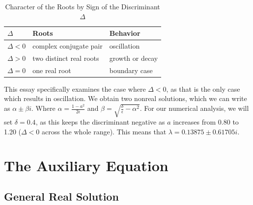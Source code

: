     \begin{table}[H]
        \centering
        \begin{tabular}{lll}
            \toprule
            \textbf{$\Delta$} & \textbf{Roots} & \textbf{Behavior} \\
            \midrule
            $\Delta<0$ & complex conjugate pair  & oscillation \\
            $\Delta>0$ & two distinct real roots & growth or decay \\
            $\Delta=0$ & one real root           & boundary case \\
            \bottomrule
        \end{tabular}
        \caption{Character of the Roots by Sign of the Discriminant $\Delta$}
        \label{tab:discriminant}
    \end{table}

    This essay specifically examines the case where $\Delta<0$, as that is the only case which results in oscillation. We obtain two nonreal solutions, which we can write as $\alpha\pm\beta i$. Where $\alpha=\frac{1-a^2}{2\epsilon}$ and $\beta=\sqrt{\frac{\delta}{\epsilon}-\alpha^2}$. For our numerical analysis, we will set $\delta=0.4$, as this keeps the discriminant negative as $a$ increases from 0.80 to 1.20 ($\Delta<0$ across the whole range). This means that $\lambda=0.13875\pm0.61705i$.

    \section{The Auxiliary Equation}\label{sec:auxiliary-equation}

    \subsection{General Real Solution}\label{subsec:general-real-solution}

